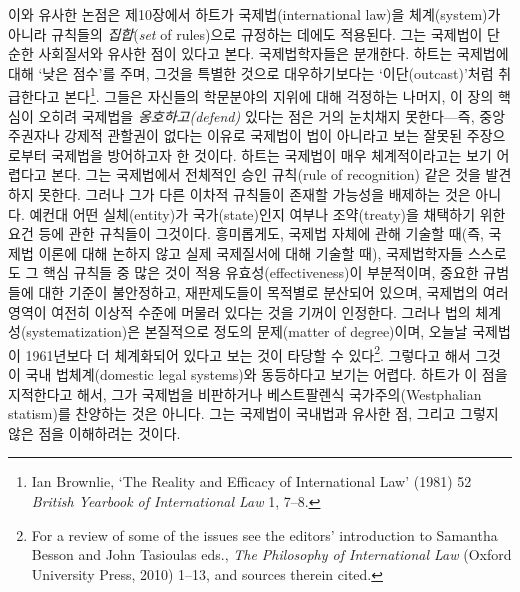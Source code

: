 \documentclass[12pt, oneside]{book}  %
\begin{document}
이와 유사한 논점은 제10장에서 하트가 국제법(international law)을
체계(system)가 아니라 규칙들의 \emph{집합}(\emph{set} of rules)으로
규정하는 데에도 적용된다. 그는 국제법이 단순한 사회질서와 유사한 점이
있다고 본다. 국제법학자들은 분개한다. 하트는 국제법에 대해 `낮은 점수'를
주며, 그것을 특별한 것으로 대우하기보다는 `이단(outcast)'처럼 취급한다고
본다\footnote{Ian Brownlie, `The Reality and Efficacy of International
  Law' (1981) 52 \emph{British Yearbook of International Law} 1, 7--8.}.
그들은 자신들의 학문분야의 지위에 대해 걱정하는 나머지, 이 장의 핵심이
오히려 국제법을 \emph{옹호하고(defend)} 있다는 점은 거의 눈치채지
못한다---즉, 중앙 주권자나 강제적 관할권이 없다는 이유로 국제법이 법이
아니라고 보는 잘못된 주장으로부터 국제법을 방어하고자 한 것이다. 하트는
국제법이 매우 체계적이라고는 보기 어렵다고 본다. 그는 국제법에서
전체적인 승인 규칙(rule of recognition) 같은 것을 발견하지 못한다.
그러나 그가 다른 이차적 규칙들이 존재할 가능성을 배제하는 것은 아니다.
예컨대 어떤 실체(entity)가 국가(state)인지 여부나 조약(treaty)을
채택하기 위한 요건 등에 관한 규칙들이 그것이다. 흥미롭게도, 국제법
자체에 관해 기술할 때(즉, 국제법 이론에 대해 논하지 않고 실제 국제질서에
대해 기술할 때), 국제법학자들 스스로도 그 핵심 규칙들 중 많은 것이 적용
유효성(effectiveness)이 부분적이며, 중요한 규범들에 대한 기준이
불안정하고, 재판제도들이 목적별로 분산되어 있으며, 국제법의 여러 영역이
여전히 이상적 수준에 머물러 있다는 것을 기꺼이 인정한다. 그러나 법의
체계성(systematization)은 본질적으로 정도의 문제(matter of degree)이며,
오늘날 국제법이 1961년보다 더 체계화되어 있다고 보는 것이 타당할 수
있다\footnote{For a review of some of the issues see the editors'
  introduction to Samantha Besson and John Tasioulas eds., \emph{The
  Philosophy of International Law} (Oxford University Press, 2010)
  1--13, and sources therein cited.}. 그렇다고 해서 그것이 국내
법체계(domestic legal systems)와 동등하다고 보기는 어렵다. 하트가 이
점을 지적한다고 해서, 그가 국제법을 비판하거나 베스트팔렌식
국가주의(Westphalian statism)를 찬양하는 것은 아니다. 그는 국제법이
국내법과 유사한 점, 그리고 그렇지 않은 점을 이해하려는 것이다.
\end{document}
